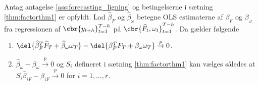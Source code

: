 \begin{thm} \label{thm:factorthm2}
Antag antagelse \ref{ass:forecasting_ligning} og betingelserne i sætning \ref{thm:factorthm1} er opfyldt. 
Lad \(\widehat{\beta}_F\) og \(\widehat{\beta}_\omega\) betegne OLS estimaterne af \(\beta_F\) og \(\beta_\omega\) fra regressionen af \(\cbr{y_{t+h}}_{t=1}^{T-h}\) på \(\cbr{\widehat{F}_t, \omega_t}_{t=1}^{T-h}\). Da gælder følgende
\begin{enumerate}
\item \(\del{\widehat{\beta}_F^T \widehat{F}_T + \widehat{\beta}_\omega \omega_T} - \del{\beta_F^T F_T + \beta_\omega \omega_T} \overset{p}{\rightarrow} 0\).
\item \(\widehat{\beta}_\omega - \beta_\omega \overset{p}{\rightarrow} 0\) og \(S_i\) defineret i sætning \ref{thm:factorthm1} kan vælges således at \(S_i \widehat{\beta}_{iF} - \beta_{iF} \overset{p}{\rightarrow} 0\) for \(i = 1, \ldots, r\).
\end{enumerate}
\end{thm}
%
